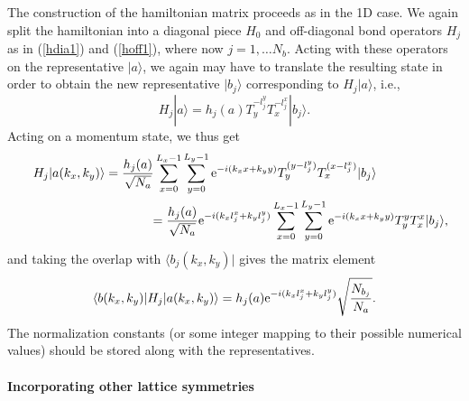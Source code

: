 \documentclass[draft,numberedheadings]{aipproc}
\begin{document}
The construction of the hamiltonian matrix proceeds as in the 1D case. We again split the hamiltonian into a diagonal
piece $H_0$ and off-diagonal bond operators $H_j$ as in (\ref{hdia1}) and (\ref{hoff1}), where now $j=1,\ldots N_b$. Acting with these operators on the 
representative $|a\rangle$, we again may have to translate the resulting state in order to obtain the new representative $|b_j\rangle$
corresponding to $H_j|a\rangle$, i.e.,
\begin{equation}
H_j|a\rangle = h_j(a)T_y^{-l_j^y}T_x^{-l_j^x}|b_j\rangle.
\end{equation}
Acting on a momentum state, we thus get
\begin{eqnarray}
&&H_j|a(k_x,k_y)\rangle = \frac{h_j(a)}{\sqrt{N_a}}\sum_{x=0}^{L_x-1}\sum_{y=0}^{L_y-1}{\rm e}^{-i(k_xx+k_yy)}
T_y^{(y-l_j^y)}T_x^{(x-l_j^x)}|b_j\rangle~~~~~~~~~~~~~~~~~ \\
&&~~~~~~~~~~~~~~~~~ =  \frac{h_j(a)}{\sqrt{N_a}}{\rm e}^{-i(k_xl_j^x+k_yl_j^y)}\sum_{x=0}^{L_x-1}\sum_{y=0}^{L_y-1}{\rm e}^{-i(k_xx+k_yy)}
T_y^yT_x^x|b_j\rangle,\nonumber
\end{eqnarray}
and taking the overlap with $\langle b_j(k_x,k_y)|$ gives the matrix element
\begin{equation}
\langle b(k_x,k_y)|H_j|a(k_x,k_y)\rangle = 
h_j(a) {\rm e}^{-i(k_xl_j^x+k_yl_j^y)}\sqrt{\frac{N_{b_j}}{N_a}}.
\label{hk2}
\end{equation}
The normalization constants (or some integer mapping to their possible numerical values) should be stored along with the representatives.

\paragraph{Incorporating other lattice symmetries}
\end{document}
